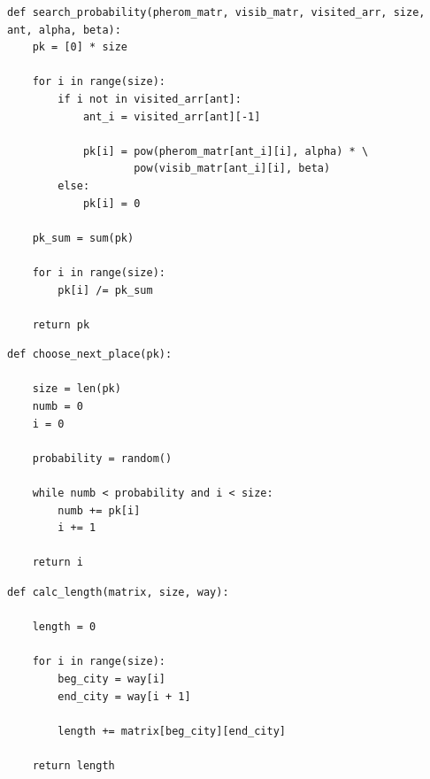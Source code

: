\documentclass[a4paper,14pt, unknownkeysallowed]{extreport}
\begin{document}
\begin{center}
\captionsetup{justification=raggedright,singlelinecheck=off}
\begin{lstlisting}[label=lst:search_probability,caption=Функция для нахождения вероятней перехода в каждый из городов]
def search_probability(pherom_matr, visib_matr, visited_arr, size, ant, alpha, beta):
    pk = [0] * size

    for i in range(size):
        if i not in visited_arr[ant]:
            ant_i = visited_arr[ant][-1]

            pk[i] = pow(pherom_matr[ant_i][i], alpha) * \
                    pow(visib_matr[ant_i][i], beta)
        else:
            pk[i] = 0

    pk_sum = sum(pk)

    for i in range(size):
        pk[i] /= pk_sum  

    return pk
\end{lstlisting}
\end{center}

\clearpage

\begin{center}
\captionsetup{justification=raggedright,singlelinecheck=off}
\begin{lstlisting}[label=lst:choose_next_place,caption=Функция выбора следующего города]
def choose_next_place(pk):

    size = len(pk)
    numb = 0
    i = 0

    probability = random()

    while numb < probability and i < size:
        numb += pk[i]
        i += 1

    return i
\end{lstlisting}
\end{center}	

\begin{center}
\captionsetup{justification=raggedright,singlelinecheck=off}
\begin{lstlisting}[label=lst:calc_length,caption= Функция нахождения длины пути]
def calc_length(matrix, size, way):

    length = 0

    for i in range(size):
        beg_city = way[i]
        end_city = way[i + 1]

        length += matrix[beg_city][end_city]

    return length
\end{lstlisting}
\end{center}
\end{document}
